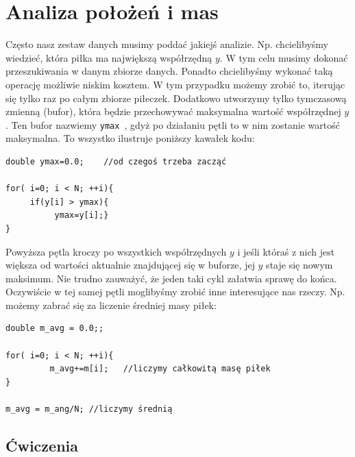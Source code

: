 \documentclass{instrukcja}
\begin{document}
\section{Analiza położeń i mas}

Często nasz zestaw danych musimy poddać jakiejś analizie. Np. chcielibyśmy wiedzieć, która piłka ma największą współrzędną \(y\). W tym celu musimy dokonać przeszukiwania w danym zbiorze danych. Ponadto chcielibyśmy wykonać taką operację możliwie niskim kosztem. W tym przypadku możemy zrobić to, iterując się tylko raz po całym zbiorze piłeczek. Dodatkowo utworzymy tylko tymczasową zmienną (bufor), która będzie przechowywać maksymalna wartość współrzędnej \(y\). Ten bufor nazwiemy {\tt ymax }, gdyż po działaniu pętli to w nim zostanie wartość maksymalna. To wszystko ilustruje poniższy kawałek kodu:

\begin{verbatim}
double ymax=0.0;	//od czegoś trzeba zacząć

for( i=0; i < N; ++i){
     if(y[i] > ymax){
          ymax=y[i];}
}
\end{verbatim}

Powyższa pętla kroczy po wszystkich współrzędnych \(y\) i jeśli któraś z nich jest większa od wartości aktualnie znajdującej się w buforze, jej  \(y\) staje się nowym maksimum. Nie trudno zauważyć, że jeden taki cykl załatwia sprawę do końca. Oczywiście w tej samej pętli moglibyśmy zrobić inne interesujące nas rzeczy. Np. możemy zabrać się za liczenie średniej masy piłek:

\begin{verbatim}
double m_avg = 0.0;;

for( i=0; i < N; ++i){
         m_avg+=m[i];	//liczymy całkowitą masę piłek
}

m_avg = m_ang/N; //liczymy średnią
\end{verbatim}
	

\subsection*{Ćwiczenia}
\end{document}
